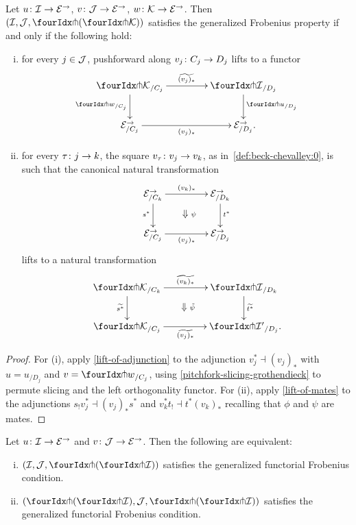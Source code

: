 \documentclass[reqno,10pt,a4paper,oneside,draft]{amsart}
\begin{document}
{{\begin{proposition} \label{lift-pushforward}
Let $u \co \cal{I} \to \catE^\to$, $v \co \cal{J} \to \cal{E}^\to$, $w \co \cal{K} \to \catE^\to$.
Then $(\cal{I}, \cal{J}, \liftl{(\liftr{\cal{K}})})$ satisfies the generalized Frobenius property if and only if the following hold:
\begin{enumerate}[(i)]
\item for every $j \in \cal{J}$, pushforward along $v_j \co C_j \to D_j$ lifts to a functor
\[
\xymatrix@C=1.5cm{
  {\liftr{\cal{K}}}_{/C_j}
  \ar[r]^{\widetilde{(v_j)_*}}
  \ar[d]_{\liftr{w}_{/C_j}}
&
  {\liftr{\cal{I}}}_{/D_j}
  \ar[d]^{{\liftr{u}}_{/D_j}}
\\
  \catE_{/C_j}^\to
  \ar[r]_{(v_j)_*}
&
  \catE_{/D_j}^\to
\rlap{.}}
\]
\item for every $\tau \co j \to k$, the square $v_\tau \co v_j \to v_k$, as in~\eqref{def:beck-chevalley:0}, is such that the canonical natural transformation
\[
\xymatrix@C+2em{
  \catE^\to_{/C_k}
  \ar[r]^{(v_k)_*}
  \ar[d]_{s^*}
  \ar@{}[dr]|{\textstyle\Downarrow \rlap{$\labelstyle\psi$}}
&
  \catE^\to_{/D_k}
  \ar[d]^{t^*}
\\
  \catE^\to_{/C_j}
  \ar[r]_{(v_j)_*}
&
  \catE^\to_{/D_j}
}
\]
lifts to a natural transformation
\[
\xymatrix@C+2em{
  {\liftr{\cal{K}}}_{/C_k}
  \ar[r]^{\widetilde{(v_k)_*}}
  \ar[d]_{\widetilde{s^*}}
  \ar@{}[dr]|{\textstyle\Downarrow \rlap{$\labelstyle\tilde{\psi}$}}
&
  {\liftr{\cal{I}}}_{/D_k}
  \ar[d]^{\widetilde{t^*}}
\\
  {\liftr{\cal{K}}}_{/C_j}
  \ar[r]_{\widetilde{(v_j)_*}}
&
  {\liftr{\cal{I}'}}_{/D_j}
\rlap{.}}
\]
\end{enumerate}
\end{proposition}

\begin{proof}
For (i), apply \cref{lift-of-adjunction} to the adjunction $v_j^* \dashv (v_j)_*$ with $u = u_{/D_j}$ and $v = {\liftr{w}}_{/C_j}$, using \cref{pitchfork-slicing-grothendieck} to permute slicing and the left orthogonality functor.
For (ii), apply \cref{lift-of-mates} to the adjunctions $s_! v_j^* \dashv (v_j)_* s^*$ and $v_k^* t_! \dashv t^* (v_k)_*$ recalling that $\phi$ and $\psi$ are mates.
\end{proof}

\begin{proposition} \label{double-pitchfork-in-generalized-uniform-frob}
Let $u \co \cal{I} \to \catE^\to$ and $v \co \cal{J} \to \catE^\to$.
Then the following are equivalent:
\begin{enumerate}[(i)]
\item $(\cal{I}, \cal{J}, \liftl{(\liftr{\cal{I}})})$ satisfies the generalized functorial Frobenius condition.
\item $(\liftl{(\liftr{\cal{I}})}, \cal{J}, \liftl{(\liftr{\cal{I}})})$ satisfies the generalized functorial Frobenius condition.
\end{enumerate}
\end{proposition}

}}
\end{document}
